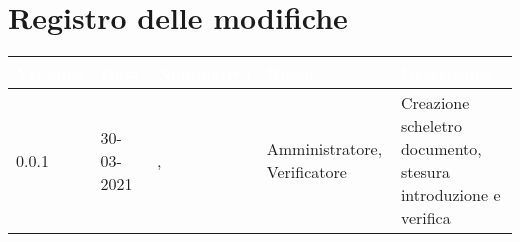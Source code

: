 \section*{Registro delle modifiche}
\setcounter{table}{-1}
{
\renewcommand{\arraystretch}{1.5}
\centering
\begin{longtable}{C{1.7cm} | C{2.2cm} | C{3.2cm} | C{3cm} | C{4.8cm}}
\textcolor{white}{\textbf{Versione}}&
\textcolor{white}{\textbf{Data}}&
\textcolor{white}{\textbf{Nominativo}}&
\textcolor{white}{\textbf{Ruolo}}&
\textcolor{white}{\textbf{Descrizione}}\\	
\endhead

0.0.1 & 30-03-2021 & \ZM{}, \SP{} & Amministratore, Verificatore & Creazione scheletro documento, stesura introduzione e verifica\\
		
\end{longtable}
}